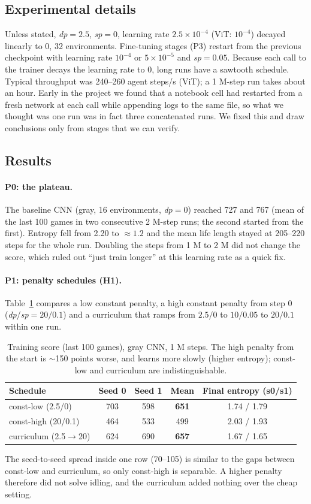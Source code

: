 \documentclass[11pt]{article}
\newcommand{\dpen}{\textit{dp}}
\newcommand{\spen}{\textit{sp}}
\begin{document}
\subsection{Experimental details}
Unless stated, \dpen$=2.5$, \spen$=0$, learning rate $2.5\!\times\!10^{-4}$ (ViT: $10^{-4}$) decayed linearly to 0, 32 environments. Fine-tuning stages (P3) restart from the previous checkpoint with learning rate $10^{-4}$ or $5\!\times\!10^{-5}$ and \spen$=0.05$. Because each call to the trainer decays the learning rate to 0, long runs have a sawtooth schedule. Typical throughput was 240--260 agent steps/s (ViT); a 1 M-step run takes about an hour. Early in the project we found that a notebook cell had restarted from a fresh network at each call while appending logs to the same file, so what we thought was one run was in fact three concatenated runs. We fixed this and draw conclusions only from stages that we can verify.

\subsection{Results}
\paragraph{P0: the plateau.} The baseline CNN (gray, 16 environments, \dpen$=0$) reached 727 and 767 (mean of the last 100 games in two consecutive 2 M-step runs; the second started from the first). Entropy fell from 2.20 to $\approx\!1.2$ and the mean life length stayed at 205--220 steps for the whole run. Doubling the steps from 1 M to 2 M did not change the score, which ruled out ``just train longer'' at this learning rate as a quick fix.

\paragraph{P1: penalty schedules (H1).} Table~\ref{tab:penalty} compares a low constant penalty, a high constant penalty from step 0 (\dpen/\spen $=20/0.1$) and a curriculum that ramps from $2.5/0$ to $10/0.05$ to $20/0.1$ within one run.
\begin{table}[h]
\centering\small
\begin{tabular}{lcccc}
\toprule
Schedule & Seed 0 & Seed 1 & Mean & Final entropy (s0/s1)\\
\midrule
const-low (2.5/0)  & 703 & 598 & \textbf{651} & 1.74 / 1.79\\
const-high (20/0.1) & 464 & 533 & 499 & 2.03 / 1.93\\
curriculum (2.5$\to$20)& 624 & 690 & \textbf{657} & 1.67 / 1.65\\
\bottomrule
\end{tabular}
\caption{Training score (last 100 games), gray CNN, 1 M steps. The high penalty from the start is $\sim$150 points worse, and learns more slowly (higher entropy); const-low and curriculum are indistinguishable.}
\label{tab:penalty}
\end{table}
The seed-to-seed spread inside one row (70--105) is similar to the gaps between const-low and curriculum, so only const-high is separable. A higher penalty therefore did not solve idling, and the curriculum added nothing over the cheap setting.
\end{document}
